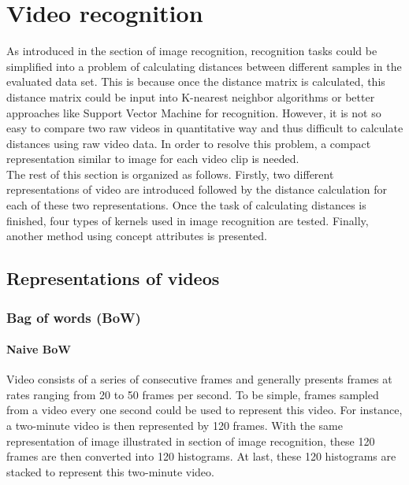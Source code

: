 \section {Video recognition}
As introduced in the section of image recognition, recognition tasks could be simplified into a problem of calculating distances between different samples in the evaluated data set. This is because once the distance matrix is calculated, this distance matrix could be input into K-nearest neighbor algorithms or better approaches like Support Vector Machine for recognition. However, it is not so easy to compare two raw videos in quantitative way and thus difficult to calculate distances using raw video data. In order to resolve this problem, a compact representation similar to image for each video clip is needed. \\

\noindent The rest of this section is organized as follows. Firstly, two different representations of video are introduced followed by the distance calculation for each of these two representations. Once the task of calculating distances is finished, four types of kernels used in image recognition are tested. Finally, another method using concept attributes is presented. 

\subsection{Representations of videos}
	\subsubsection{Bag of words (BoW)}
	\paragraph{Naive BoW}
	Video consists of a series of consecutive frames and generally presents frames at rates ranging from 20 to 50 frames per second. To be simple, frames sampled from a video every one second could be used to represent this video. For instance, a two-minute video is then represented by 120 frames. With the same representation of image illustrated in section of image recognition, these 120 frames are then converted into 120 histograms. At last, these 120 histograms are stacked to represent this two-minute video. \\

